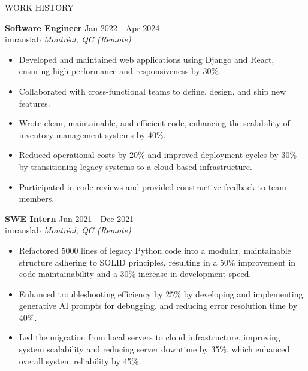 \documentclass{resume} %
\begin{document}
\begin{rSection}{WORK HISTORY}

\textbf{Software Engineer} \hfill Jan 2022 - Apr 2024\\
imranslab \hfill \textit{Montréal, QC (Remote)}
 \begin{itemize}
    \item Developed and maintained web applications using Django and React, ensuring high performance and responsiveness by 30\%.
    \item Collaborated with cross-functional teams to define, design, and ship new features.
    \item Wrote clean, maintainable, and efficient code, enhancing the scalability of inventory management systems by 40\%.
    \item Reduced operational costs by 20\% and improved deployment cycles by 30\% by transitioning legacy systems to a cloud-based infrastructure.
    \item Participated in code reviews and provided constructive feedback to team members.
 \end{itemize}

\textbf{SWE Intern} \hfill Jun 2021 - Dec 2021\\
imranslab \hfill \textit{Montréal, QC (Remote)}
 \begin{itemize}
    \item Refactored 5000 lines of legacy Python code into a modular, maintainable structure adhering to SOLID principles, resulting in a 50\% improvement in code maintainability and a 30\% increase in development speed.
    \item Enhanced troubleshooting efficiency by 25\% by developing and implementing generative AI prompts for debugging. and reducing error resolution time by 40\%.
    \item Led the migration from local servers to cloud infrastructure, improving system scalability and reducing server downtime by 35\%, which enhanced overall system reliability by 45\%.
 \end{itemize}

\end{rSection} 

\end{document}

